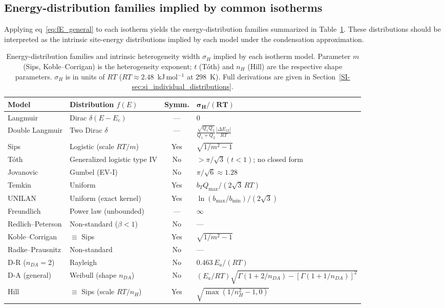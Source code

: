 \documentclass[journal=jacsat,manuscript=article]{achemso}
\begin{document}
	\subsection{Energy-distribution families implied by common isotherms}
	\label{sec:energy_families}
	
	Applying eq~\eqref{eq:fE_general} to each isotherm yields the energy-distribution families summarized in Table~\ref{tab:energy_distributions}. These distributions should be interpreted as the intrinsic site-energy distributions implied by each model under the condensation approximation.
	
	\begin{table}[H]
		\small
		\caption{Energy-distribution families and intrinsic heterogeneity width $\sigma_H$ implied by each isotherm model. Parameter $m$ (Sips, Koble--Corrigan) is the heterogeneity exponent; $t$ (T\'{o}th) and $n_H$ (Hill) are the respective shape parameters. $\sigma_H$ is in units of $RT$ ($RT\approx 2.48$~kJ\,mol$^{-1}$ at $298$~K). Full derivations are given in Section~\ref{SI-sec:si_individual_distributions}.}
		\label{tab:energy_distributions}
		\renewcommand{\arraystretch}{1.4}
		\begin{tabular}{@{} l l c l @{}}
			\hline
			\textbf{Model}
			& \textbf{Distribution $f(E)$}
			& \textbf{Symm.}
			& $\boldsymbol{\sigma_H/(RT)}$ \\
			\hline
			Langmuir
			& Dirac $\delta(E-E_c)$
			& ---
			& $0$ \\
			Double Langmuir
			& Two Dirac $\delta$
			& ---
			& $\tfrac{\sqrt{Q_1 Q_2}}{Q_1+Q_2}\tfrac{|\Delta E_{12}|}{RT}$ \\
			Sips
			& Logistic (scale $RT/m$)
			& Yes
			& $\sqrt{1/m^2-1}$ \\
			T\'{o}th
			& Generalized logistic type IV
			& No
			& $>\pi/\sqrt{3}$\;$(t<1)$; no closed form \\
			Jovanovic
			& Gumbel (EV-I)
			& No
			& $\pi/\sqrt{6}\approx 1.28$ \\
			Temkin
			& Uniform
			& Yes
			& $b_T Q_{\max}/(2\sqrt{3}\,RT)$ \\
			UNILAN
			& Uniform (exact kernel)
			& Yes
			& $\ln(b_{\max}/b_{\min})/(2\sqrt{3})$ \\
			Freundlich
			& Power law (unbounded)
			& ---
			& $\infty$ \\
			Redlich--Peterson
			& Non-standard ($\beta < 1$)
			& No
			& --- \\
			Koble--Corrigan
			& $\equiv$ Sips
			& Yes
			& $\sqrt{1/m^2-1}$ \\
			Radke--Prausnitz
			& Non-standard
			& No
			& --- \\
			D-R ($n_{DA}=2$)
			& Rayleigh
			& No
			& $0.463\,E_a/(RT)$ \\
			D-A (general)
			& Weibull (shape $n_{DA}$)
			& No
			& $(E_a/RT)\sqrt{\Gamma(1+2/n_{DA})-[\Gamma(1+1/n_{DA})]^2}$ \\
			Hill
			& $\equiv$ Sips (scale $RT/n_H$)
			& Yes
			& $\sqrt{\max(1/n_H^2-1,0)}$ \\
			\hline
		\end{tabular}
	\end{table}
	
\end{document}

